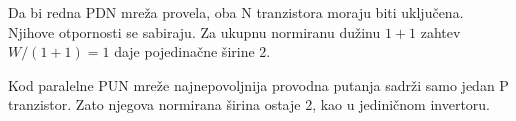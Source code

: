 Da bi redna PDN mreža provela, oba N tranzistora moraju biti uključena. Njihove otpornosti se sabiraju. Za ukupnu normiranu dužinu $1+1$ zahtev $W/(1+1)=1$ daje pojedinačne širine 2.

Kod paralelne PUN mreže najnepovoljnija provodna putanja sadrži samo jedan P tranzistor. Zato njegova normirana širina ostaje 2, kao u jediničnom invertoru.
